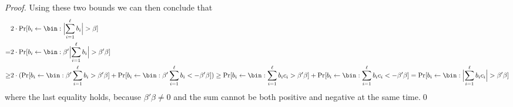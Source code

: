 \begin{proof}
  Using these two bounds we can then conclude that
  \begin{align*}
    &2\cdot\Pr[b_i \gets \bin : \Bigl|\sum_{i=1}^\ell b_i\Bigr| > \beta]\\
    =&2\cdot\Pr[b_i \gets \bin : \beta'\Bigl|\sum_{i=1}^\ell b_i\Bigr| > \beta'\beta]\\
    \geq&2\cdot(\Pr[b_i \gets \bin : \beta'\sum_{i=1}^\ell b_i > \beta'\beta] + \Pr[b_i \gets \bin : \beta'\sum_{i=1}^\ell b_i < -\beta'\beta])
    \geq \Pr[b_i \gets \bin : \sum_{i=1}^\ell b_i c_i > \beta'\beta]+\Pr[b_i \gets \bin : \sum_{i=1}^\ell b_i c_i < -\beta'\beta]
    = \Pr[b_i \gets \bin : \Bigl|\sum_{i=1}^\ell b_i c_i\Bigr| > \beta'\beta]
  \end{align*}
  where the last equality holds, because $\beta'\beta\neq 0$ and the sum cannot be both positive and negative at the same time.\qed
\end{proof}
